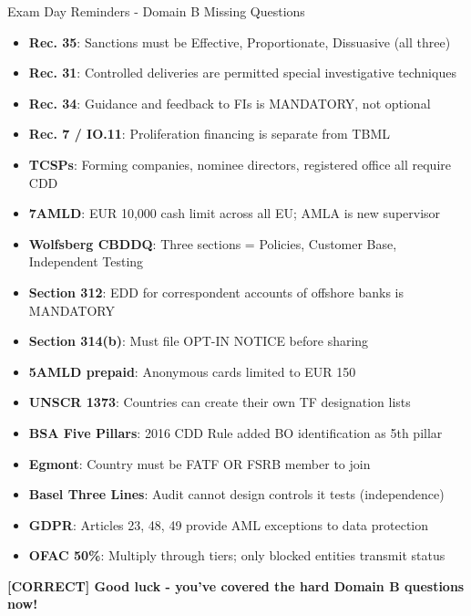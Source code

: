 \documentclass[11pt,a4paper]{beamer}
\newcommand{\greennote}[1]{\textcolor{green!50!black}{\textbf{[CORRECT] #1}}}
\begin{document}
\begin{frame}{Exam Day Reminders - Domain B Missing Questions}
\begin{itemize}
\item \textbf{Rec. 35}: Sanctions must be Effective, Proportionate, Dissuasive (all three)
\item \textbf{Rec. 31}: Controlled deliveries are permitted special investigative techniques
\item \textbf{Rec. 34}: Guidance and feedback to FIs is MANDATORY, not optional
\item \textbf{Rec. 7 / IO.11}: Proliferation financing is separate from TBML
\item \textbf{TCSPs}: Forming companies, nominee directors, registered office all require CDD
\item \textbf{7AMLD}: EUR 10,000 cash limit across all EU; AMLA is new supervisor
\item \textbf{Wolfsberg CBDDQ}: Three sections = Policies, Customer Base, Independent Testing
\item \textbf{Section 312}: EDD for correspondent accounts of offshore banks is MANDATORY
\item \textbf{Section 314(b)}: Must file OPT-IN NOTICE before sharing
\item \textbf{5AMLD prepaid}: Anonymous cards limited to EUR 150
\item \textbf{UNSCR 1373}: Countries can create their own TF designation lists
\item \textbf{BSA Five Pillars}: 2016 CDD Rule added BO identification as 5th pillar
\item \textbf{Egmont}: Country must be FATF OR FSRB member to join
\item \textbf{Basel Three Lines}: Audit cannot design controls it tests (independence)
\item \textbf{GDPR}: Articles 23, 48, 49 provide AML exceptions to data protection
\item \textbf{OFAC 50\%}: Multiply through tiers; only blocked entities transmit status
\end{itemize}
\vspace{0.3cm}
\centering
\greennote{Good luck - you've covered the hard Domain B questions now!}
\end{frame}
\end{document}
